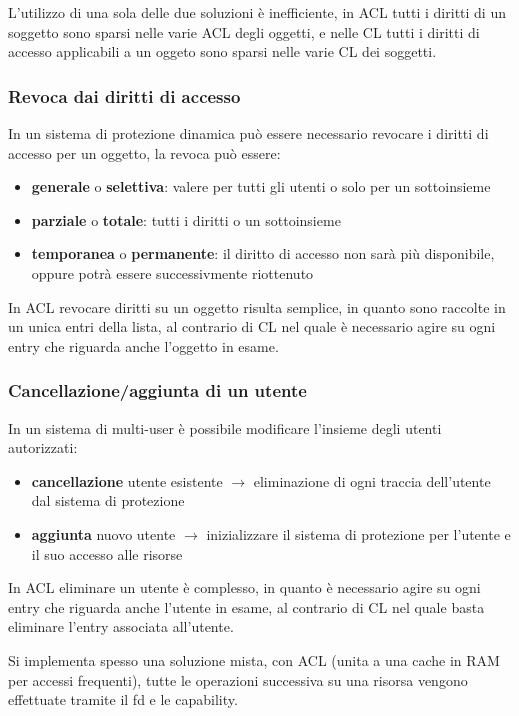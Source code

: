 L'utilizzo di una sola delle due soluzioni è inefficiente, in ACL tutti i diritti di un soggetto sono sparsi nelle varie ACL degli oggetti, e nelle CL tutti i diritti di accesso applicabili a un oggeto sono sparsi nelle varie CL dei soggetti.

\subsubsection{Revoca dai diritti di accesso}

In un sistema di protezione dinamica può essere necessario revocare i diritti di accesso per un oggetto, la revoca può essere:
\begin{itemize}
    \item \textbf{generale} o \textbf{selettiva}: valere per tutti gli utenti o solo per un sottoinsieme
    \item \textbf{parziale} o \textbf{totale}: tutti i diritti o un sottoinsieme
    \item \textbf{temporanea} o \textbf{permanente}: il diritto di accesso non sarà più disponibile, oppure potrà essere successivmente riottenuto
\end{itemize}

In ACL revocare diritti su un oggetto risulta semplice, in quanto sono raccolte in un unica entri della lista, al contrario di CL nel quale è necessario agire su ogni entry che riguarda anche l'oggetto in esame.

\subsubsection{Cancellazione/aggiunta di un utente}
In un sistema di multi-user è possibile modificare l'insieme degli utenti autorizzati:
\begin{itemize}
    \item \textbf{cancellazione} utente esistente $\rightarrow$ eliminazione di ogni traccia dell'utente dal sistema di protezione
    \item \textbf{aggiunta} nuovo utente $\rightarrow$ inizializzare il sistema di protezione per l'utente e il suo accesso alle risorse
\end{itemize}

In ACL eliminare un utente è complesso, in quanto è necessario agire su ogni entry che riguarda anche l'utente in esame, al contrario di CL nel quale basta eliminare l'entry associata all'utente.

Si implementa spesso una soluzione mista, con ACL (unita a una cache in RAM per accessi frequenti), tutte le operazioni successiva su una risorsa vengono effettuate tramite il fd e le capability.

